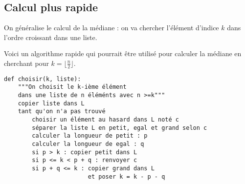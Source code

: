 \subsection{Calcul plus rapide} 
On généralise le calcul de la médiane : on va chercher l'élément d'indice $k$ dans l'ordre croissant dans une liste.


Voici un algorithme rapide qui  pourrait être utilisé pour calculer la médiane en cherchant pour $k = \lfloor\frac n2\rfloor$.


\begin{lstlisting}
def choisir(k, liste):
    """On choisit le k-ième élément
    dans une liste de n éléménts avec n >=k"""
    copier liste dans L
    tant qu'on n'a pas trouvé
        choisir un élément au hasard dans L noté c
        séparer la liste L en petit, egal et grand selon c
        calculer la longueur de petit : p
        calculer la longueur de egal : q
        si p > k : copier petit dans L
        si p <= k < p + q : renvoyer c
        si p + q <= k : copier grand dans L 
                        et poser k = k - p - q
\end{lstlisting}

